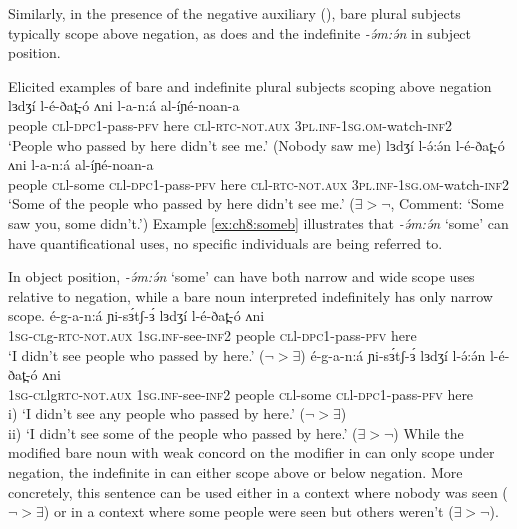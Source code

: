 


Similarly, in the presence of the negative auxiliary (), bare plural subjects typically scope above negation, as does and the indefinite \textit{-ə́m:ə́n} in subject position. 

\ea Elicited examples of bare and indefinite plural subjects scoping above negation
\ea \gll lɜdʒí l-é-ðat̪-ó ʌni  l-a-n:á al-íɲé-noan-a\\
people \textsc{cl}l-\textsc{dpc1-}pass-\textsc{pfv} here \textsc{cl}l-\textsc{rtc}-\textsc{not.aux} \textsc{3pl.inf}-\textsc{1sg.om}-watch-\textsc{inf2}\\
\glt `People who passed by here didn't see me.' (Nobody saw me)
\ex \gll lɜdʒí l-ə́:ə́n l-é-ðat̪-ó ʌni  l-a-n:á al-íɲé-noan-a\\
people \textsc{cl}l-some \textsc{cl}l-\textsc{dpc1-}pass-\textsc{pfv} here \textsc{cl}l-\textsc{rtc}-\textsc{not.aux} \textsc{3pl.inf}-\textsc{1sg.om}-watch-\textsc{inf2}\\
\glt `Some of the people who passed by here didn't see me.' ($\exists>\neg$, Comment: `Some saw you, some didn't.') \label{ex:ch8:someb}
\z 
\z 
Example \ref{ex:ch8:someb} illustrates that \textit{-ə́m:ə́n} `some' can have quantificational uses, no specific individuals are being referred to.

In object position, \textit{-ə́m:ə́n} `some' can have both narrow and wide scope uses relative to negation, while a bare noun interpreted indefinitely has only narrow scope.
\ea 
\ea \gll  é-g-a-n:á ɲi-sɜ́tʃ-ɜ́  lɜdʒí l-é-ðat̪-ó ʌni \\
\textsc{1sg-cl}g-\textsc{rtc}-\textsc{not.aux} \textsc{1sg.inf}-see-\textsc{inf2} people \textsc{cl}l-\textsc{dpc1-}pass-\textsc{pfv} here \\
\glt `I didn't see people who passed by here.' ($\neg>\exists$) \label{ex:ch8:someaa} 
\ex \gll  é-g-a-n:á ɲi-sɜ́tʃ-ɜ́ lɜdʒí  l-ə́:ə́n  l-é-ðat̪-ó ʌni \\
\textsc{1sg-cl}lg\textsc{rtc}-\textsc{not.aux} \textsc{1sg.inf}-see-\textsc{inf2} people \textsc{cl}l-some \textsc{cl}l-\textsc{dpc1-}pass-\textsc{pfv} here \\
\glt i) `I didn't see any people who passed by here.' ($\neg>\exists$)\\ \label{ex:ch8:somebb} 
	 ii) `I didn't see some of the people who passed by here.' ($\exists>\neg$) 
\z 
\z 
While the modified bare noun with weak concord on the modifier in  can only scope under negation, the indefinite in  can either scope above or below negation. More concretely, this sentence can be used either in a context where nobody was seen ($\neg>\exists$) or in a context where some people were seen but others weren't ($\exists>\neg$).

